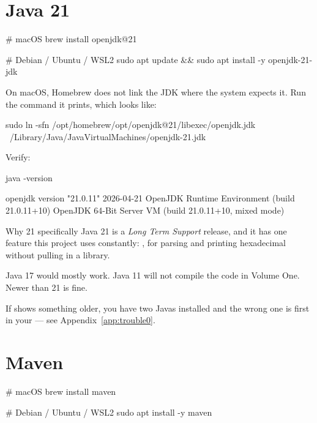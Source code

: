\section{Java 21}

\begin{shell}
# macOS
brew install openjdk@21

# Debian / Ubuntu / WSL2
sudo apt update && sudo apt install -y openjdk-21-jdk
\end{shell}

On macOS, Homebrew does not link the JDK where the system expects it. Run the
command it prints, which looks like:

\begin{shell}
sudo ln -sfn /opt/homebrew/opt/openjdk@21/libexec/openjdk.jdk \
             /Library/Java/JavaVirtualMachines/openjdk-21.jdk
\end{shell}

Verify:

\begin{shell}
java -version
\end{shell}

\begin{trace}
openjdk version "21.0.11" 2026-04-21
OpenJDK Runtime Environment (build 21.0.11+10)
OpenJDK 64-Bit Server VM (build 21.0.11+10, mixed mode)
\end{trace}

\begin{concept}{Why 21 specifically}
Java 21 is a \emph{Long Term Support} release, and it has one feature this
project uses constantly: \code{HexFormat}, for parsing and printing hexadecimal
without pulling in a library.

Java 17 would mostly work. Java 11 will not compile the code in Volume One.
Newer than 21 is fine.

If  shows something older, you have two Javas installed and
the wrong one is first in your \code{PATH} --- see
Appendix~\ref{app:trouble0}.
\end{concept}

\section{Maven}

\begin{shell}
# macOS
brew install maven

# Debian / Ubuntu / WSL2
sudo apt install -y maven
\end{shell}


